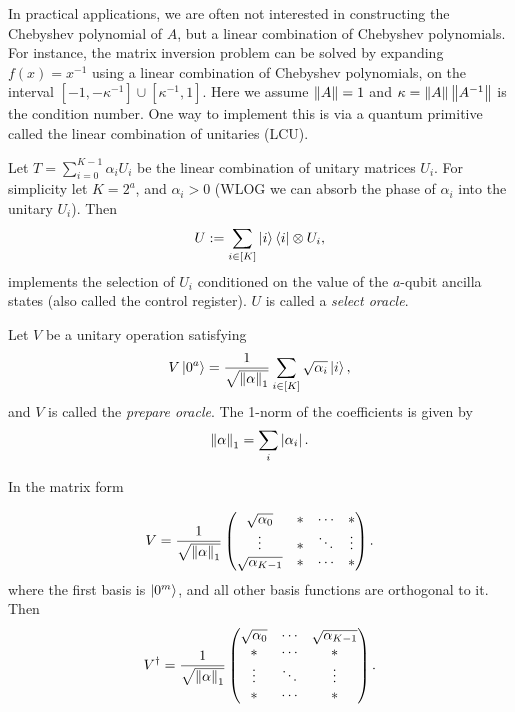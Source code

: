 In practical applications, we are often not interested in constructing the Chebyshev polynomial of $A$, but a linear combination of Chebyshev polynomials.
For instance, the matrix inversion problem can be solved by expanding $f(x)=x^{-1}$ using a linear combination of Chebyshev polynomials, on the interval $[-1,-\kappa^{-1}]\cup [\kappa^{-1},1]$. Here we assume $\left\lVert A\right\rVert=1$ and $\kappa=\left\lVert A\right\rVert\left\lVert A^{-1}\right\rVert$ is the condition number. 
One way to implement this is via a quantum primitive called the linear combination of unitaries (LCU).


Let \(T=\sum_{i=0}^{K-1}  \alpha_i U_i\) be the linear combination of
unitary matrices $U_i$. For simplicity let
\(K=2^a\), and $\alpha_i>0$ (WLOG we can absorb the phase of $\alpha_i$ into the unitary $U_i$).  Then
\begin{equation}
U:=\sum_{i\in[K]} \ket{i}\bra{i}\otimes U_i,
\end{equation}
implements the selection of \(U_i\) conditioned on the value of the
\(a\)-qubit ancilla states (also called the control register). \(U\) is
called a \emph{select oracle}. 

Let \(V\) be a unitary operation
satisfying
\begin{equation}\label{eqn:prepare_oracle}
V\ket{0^a}=\frac{1}{\sqrt{\left\lVert\alpha\right\rVert_1}}\sum_{i\in[K]} \sqrt{\alpha_i}\ket{i},
\end{equation}
and \(V\) is called the \emph{prepare oracle}. 
The 1-norm of the coefficients is given by
\begin{equation}
\left\lVert\alpha\right\rVert_1=\sum_{i} \left\lvert\alpha_i\right\rvert.
\end{equation}

In the matrix form

\begin{equation}
V=\frac{1}{\sqrt{\left\lVert\alpha\right\rVert_1}}\begin{pmatrix}
\sqrt{\alpha_0} & * & \cdots & *\\
\vdots & *& \ddots & \vdots \\
\sqrt{\alpha_{K-1}} & *& \cdots & *
\end{pmatrix}.
\end{equation}
where the first basis is \(\ket{0^m}\), and all other basis functions
are orthogonal to it. Then
\begin{equation}
V^{\dagger}=\frac{1}{\sqrt{\left\lVert\alpha\right\rVert_1}}\begin{pmatrix}
\sqrt{\alpha_0} & \cdots & \sqrt{\alpha_{K-1}}\\
* & \cdots & * \\
\vdots & \ddots & \vdots \\
* & \cdots & *
\end{pmatrix}.
\label{eqn:VmatrixDag}
\end{equation}

